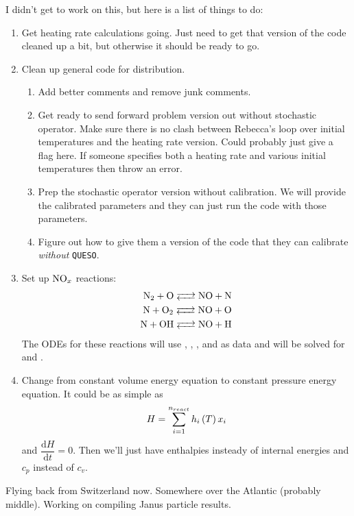 I didn't get to work on this, but here is a list of things to do:
\begin{enumerate}
  \item Get heating rate calculations going.  Just need to get that version of the code cleaned up a bit, but otherwise it should be ready to go.
  \item Clean up general code for distribution.
    \begin{enumerate}
      \item Add better comments and remove junk comments.
      \item Get ready to send forward problem version out without stochastic operator.  Make sure there is no clash between Rebecca's loop over initial temperatures and the heating rate version.  Could probably just give a flag here.  If someone specifies both a heating rate and various initial temperatures then throw an error.
      \item Prep the stochastic operator version without calibration.  We will provide the calibrated parameters and they can just run the code with those parameters.
      \item Figure out how to give them a version of the code that they can calibrate \textit{without} \texttt{QUESO}.
    \end{enumerate}
    \item Set up $\ce{NO_x}$ reactions:
      \begin{align*}
        \ce{N2 + O <--> NO + N} \\
        \ce{N + O2 <--> NO + O} \\
        \ce{N + OH <--> NO + H}
      \end{align*}
      The ODEs for these reactions will use , , , and  as data and will be solved for  and .
    \item Change from constant volume energy equation to constant pressure energy equation.  It could be as simple as
      \begin{align*}
        H = \sum_{i=1}^{n_{react}}{h_{i}\left(T\right)x_{i}}
      \end{align*}
      and $\dfrac{\mathrm{d}H}{\mathrm{d}t} = 0$.  Then we'll just have enthalpies insteady of internal energies and $c_{p}$ instead of $c_{v}$.
\end{enumerate}

Flying back from Switzerland now.  Somewhere over the Atlantic (probably middle).  Working on compiling Janus particle results.

